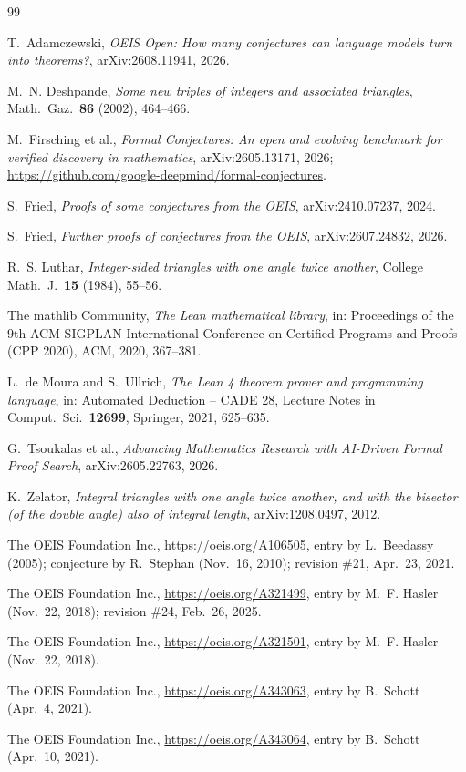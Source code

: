 \documentclass[11pt]{amsart}
\theoremstyle{plain}
\theoremstyle{definition}
\begin{document}
{\small
\begin{thebibliography}{99}

T.~Adamczewski, \emph{OEIS Open: How many conjectures can language models turn into theorems?}, arXiv:2608.11941, 2026.

M.~N. Deshpande, \emph{Some new triples of integers and associated triangles}, Math.\ Gaz.\ \textbf{86} (2002), 464--466.

M.~Firsching et al., \emph{Formal Conjectures: An open and evolving benchmark for verified discovery in mathematics}, arXiv:2605.13171, 2026; \url{https://github.com/google-deepmind/formal-conjectures}.

S.~Fried, \emph{Proofs of some conjectures from the OEIS}, arXiv:2410.07237, 2024.

S.~Fried, \emph{Further proofs of conjectures from the OEIS}, arXiv:2607.24832, 2026.

R.~S. Luthar, \emph{Integer-sided triangles with one angle twice another}, College Math.\ J.\ \textbf{15} (1984), 55--56.

The mathlib Community, \emph{The Lean mathematical library}, in: Proceedings of the 9th ACM SIGPLAN International Conference on Certified Programs and Proofs (CPP 2020), ACM, 2020, 367--381.

L.~de Moura and S.~Ullrich, \emph{The Lean 4 theorem prover and programming language}, in: Automated Deduction -- CADE 28, Lecture Notes in Comput.\ Sci.\ \textbf{12699}, Springer, 2021, 625--635.

G.~Tsoukalas et al., \emph{Advancing Mathematics Research with AI-Driven Formal Proof Search}, arXiv:2605.22763, 2026.

K.~Zelator, \emph{Integral triangles with one angle twice another, and with the bisector (of the double angle) also of integral length}, arXiv:1208.0497, 2012.

The OEIS Foundation Inc., \url{https://oeis.org/A106505}, entry by L.~Beedassy (2005); conjecture by R.~Stephan (Nov.~16, 2010); revision \#21, Apr.~23, 2021.

The OEIS Foundation Inc., \url{https://oeis.org/A321499}, entry by M.~F. Hasler (Nov.~22, 2018); revision \#24, Feb.~26, 2025.

The OEIS Foundation Inc., \url{https://oeis.org/A321501}, entry by M.~F. Hasler (Nov.~22, 2018).

The OEIS Foundation Inc., \url{https://oeis.org/A343063}, entry by B.~Schott (Apr.~4, 2021).

The OEIS Foundation Inc., \url{https://oeis.org/A343064}, entry by B.~Schott (Apr.~10, 2021).

\end{thebibliography}
}
\end{document}
